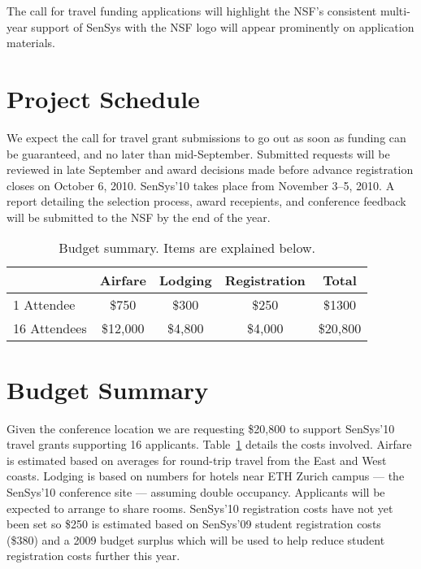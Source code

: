 The call for travel funding applications will highlight the NSF's consistent
multi-year support of SenSys with the NSF logo will appear prominently on
application materials.

\section{Project Schedule}

We expect the call for travel grant submissions to go out as soon as funding
can be guaranteed, and no later than mid-September. Submitted requests will
be reviewed in late September and award decisions made before advance
registration closes on October 6, 2010. SenSys'10 takes place from November
3--5, 2010. A report detailing the selection process, award recepients, and
conference feedback will be submitted to the NSF by the end of the year.

\begin{table}[t]
\begin{center}
\begin{tabular}{|l|ccc|c|}
\hline
& \textbf{Airfare} & \textbf{Lodging} & \textbf{Registration} & \textbf{Total} \\
\hline \hline
1 Attendee & \$750 & \$300 & \$250 & \$1300 \\
16 Attendees & \$12,000 & \$4,800 & \$4,000 & \$20,800 \\
\hline
\end{tabular}
\end{center}
\caption{Budget summary. Items are explained below.}
\label{table-budget}
\end{table}

\section{Budget Summary}

Given the conference location we are requesting \$20,800 to support SenSys'10
travel grants supporting 16 applicants. Table~\ref{table-budget} details the
costs involved. Airfare is estimated based on averages for round-trip travel
from the East and West coasts. Lodging is based on numbers for hotels near
ETH Zurich campus --- the SenSys'10 conference site --- assuming double
occupancy. Applicants will be expected to arrange to share rooms. SenSys'10
registration costs have not yet been set so \$250 is estimated based on
SenSys'09 student registration costs (\$380) and a 2009 budget surplus which
will be used to help reduce student registration costs further this year.

